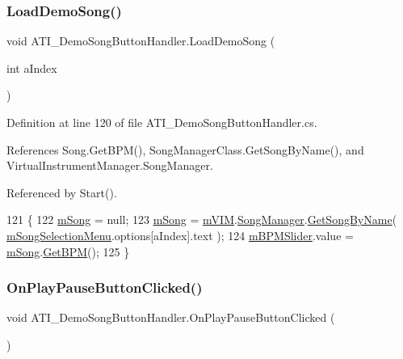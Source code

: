 \subsubsection{\texorpdfstring{Load\+Demo\+Song()}{LoadDemoSong()}}
{\footnotesize\ttfamily void A\+T\+I\+\_\+\+Demo\+Song\+Button\+Handler.\+Load\+Demo\+Song (\begin{DoxyParamCaption}\item[{int}]{a\+Index }\end{DoxyParamCaption})}



Definition at line 120 of file A\+T\+I\+\_\+\+Demo\+Song\+Button\+Handler.\+cs.



References Song.\+Get\+B\+P\+M(), Song\+Manager\+Class.\+Get\+Song\+By\+Name(), and Virtual\+Instrument\+Manager.\+Song\+Manager.



Referenced by Start().


\begin{DoxyCode}
121     \{
122         \hyperlink{class_a_t_i___demo_song_button_handler_aef782d481c6250a9062162c71298ed8f}{mSong} = null;
123         \hyperlink{class_a_t_i___demo_song_button_handler_aef782d481c6250a9062162c71298ed8f}{mSong} = \hyperlink{class_a_t_i___demo_song_button_handler_ac078f283ce74a7b310ebb2cbbc55f70b}{mVIM}.\hyperlink{group___v_i_m_pub_ga33dae94932c10c66db76a0eebec76b01}{SongManager}.\hyperlink{group___s_m_pub_func_gafe818c55bd858c52c95a2fa7a566006a}{GetSongByName}( 
      \hyperlink{class_a_t_i___demo_song_button_handler_af58c5b6dd392fbf606b74188b02044ce}{mSongSelectionMenu}.options[aIndex].text );
124         \hyperlink{class_a_t_i___demo_song_button_handler_a7d1ed48ed81d7fc9fbde52f8ee87600e}{mBPMSlider}.value = \hyperlink{class_a_t_i___demo_song_button_handler_aef782d481c6250a9062162c71298ed8f}{mSong}.\hyperlink{group___song_pub_func_gaaaf3d27d474713d7d368e3fd4c570be0}{GetBPM}();
125     \}
\end{DoxyCode}
\mbox{\label{class_a_t_i___demo_song_button_handler_a2b25debcc12ccdd2db23d4339d80f260}} 
\subsubsection{\texorpdfstring{On\+Play\+Pause\+Button\+Clicked()}{OnPlayPauseButtonClicked()}}
{\footnotesize\ttfamily void A\+T\+I\+\_\+\+Demo\+Song\+Button\+Handler.\+On\+Play\+Pause\+Button\+Clicked (\begin{DoxyParamCaption}{ }\end{DoxyParamCaption})}



